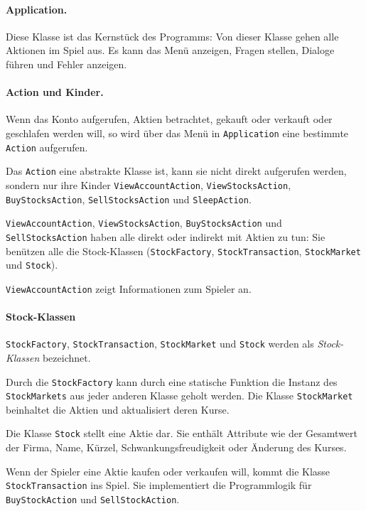 \documentclass[paper=a4, fontsize=11pt]{scrartcl}
\numberwithin{equation}{section}		%
\numberwithin{figure}{section}			%
\numberwithin{table}{section}				%
\begin{document}
	\paragraph{Application.} Diese Klasse ist das Kernstück des Programms: Von dieser Klasse gehen alle Aktionen im Spiel aus. Es kann das Menü anzeigen, Fragen stellen, Dialoge führen und Fehler anzeigen.
	
	\paragraph{Action und Kinder.} Wenn das Konto aufgerufen, Aktien betrachtet, gekauft oder verkauft oder geschlafen werden will, so wird über das Menü in \texttt{Application} eine bestimmte \texttt{Action} aufgerufen.
	
	Das \texttt{Action} eine abstrakte Klasse ist, kann sie nicht direkt aufgerufen werden, sondern nur ihre Kinder \texttt{ViewAccountAction}, \texttt{ViewStocksAction}, \texttt{BuyStocksAction}, \texttt{SellStocksAction} und \texttt{SleepAction}. 
	
	\texttt{ViewAccountAction}, \texttt{ViewStocksAction}, \texttt{BuyStocksAction} und \texttt{SellStocksAction} haben alle direkt oder indirekt mit Aktien zu tun: Sie benützen alle die Stock-Klassen (\texttt{StockFactory}, \texttt{StockTransaction}, \texttt{StockMarket} und \texttt{Stock}).
	
	\texttt{ViewAccountAction} zeigt Informationen zum Spieler an.
	
	\paragraph{Stock-Klassen}
	
	\texttt{StockFactory}, \texttt{StockTransaction}, \texttt{StockMarket} und \texttt{Stock} werden als \textit{Stock-Klassen} bezeichnet.
	
	Durch die \texttt{StockFactory} kann durch eine statische Funktion die Instanz des \texttt{StockMarkets} aus jeder anderen Klasse geholt werden. Die Klasse \texttt{StockMarket} beinhaltet die Aktien und aktualisiert deren Kurse.
	
	Die Klasse \texttt{Stock} stellt eine Aktie dar. Sie enthält Attribute wie der Gesamtwert der Firma, Name, Kürzel, Schwankungsfreudigkeit oder Änderung des Kurses.
	
	Wenn der Spieler eine Aktie kaufen oder verkaufen will, kommt die Klasse \texttt{StockTransaction} ins Spiel. Sie implementiert die Programmlogik für \texttt{BuyStockAction} und \texttt{SellStockAction}.
	
\end{document}

